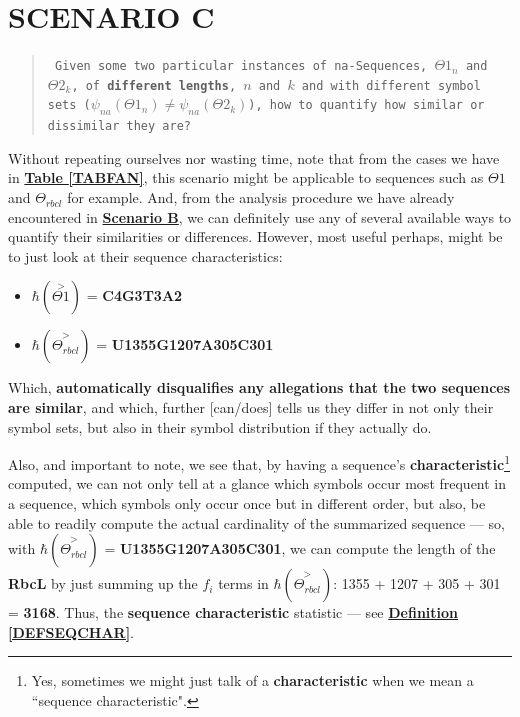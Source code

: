 \documentclass[a4paper, 18pt]{book} %
\begin{document}
\section{SCENARIO C}
\label{SECSCENC}

\begin{quote}
\small
\texttt{
Given some two particular instances of na-Sequences, $\Theta1_n$ and $\Theta2_k$, of \textbf{different lengths}, $n$ and $k$ and with different symbol sets ($\psi_{na}(\Theta1_n) \neq \psi_{na}(\Theta2_k)$), how to quantify how similar or dissimilar they are?}
\end{quote}

Without repeating ourselves nor wasting time, note that from the cases we have in \textbf{\hyperref[TABFAN]{Table \ref{TABFAN}}}, this scenario might be applicable to sequences such as $\Theta1$ and $\Theta_{rbcl}$ for example. And, from the analysis procedure we have already encountered in \textbf{\hyperref[SECSCENB]{Scenario B}}, we can definitely use any of several available ways to quantify their similarities or differences. However, most useful perhaps, might be to just look at their sequence characteristics:

\begin{itemize}
\item $\hbar(\overset{>}{\Theta1})$ = \textbf{C4G3T3A2}
\item $\hbar(\overset{>}{\Theta_{rbcl}})$ = \textbf{U1355G1207A305C301}
\end{itemize}

Which, \textbf{automatically disqualifies any allegations that the two sequences are similar}, and which, further [can/does] tells us they differ in not only their symbol sets, but also in their symbol distribution if they actually do.

Also, and important to note, we see that, by having a sequence's \textbf{characteristic}\footnote{Yes, sometimes we might just talk of a \textbf{characteristic} when we mean a ``sequence characteristic".} computed, we can not only tell at a glance which symbols occur most frequent in a sequence, which symbols only occur once but in different order, but also, be able to readily compute the actual cardinality of the summarized sequence --- so, with $\hbar(\overset{>}{\Theta_{rbcl}})$ = \textbf{U1355G1207A305C301}, we can compute the length of the \textbf{RbcL} by just summing up the $f_i$ terms in $\hbar(\overset{>}{\Theta_{rbcl}})$: 1355 + 1207 + 305 + 301 = \textbf{3168}. Thus, the \textbf{sequence characteristic} statistic --- see \textbf{\hyperref[DEFSEQCHAR]{Definition \ref{DEFSEQCHAR}}}. 
\end{document}
